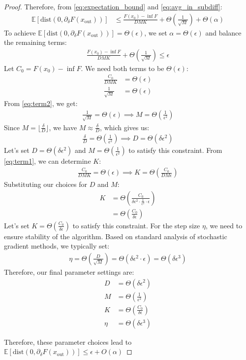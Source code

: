 \documentclass[letterpaper]{article} %
\newcommand{\1}{\mathbf{1}}
\begin{document}
\begin{proof}
Therefore, from \eqref{eq:expectation_bound} and \eqref{eq:avg_in_subdiff}:
\begin{align}
\mathbb{E}[\text{dist}(0, \partial_\delta F(x_{\text{out}}))] &\leq \frac{F(x_0) - \inf F}{D M K} + \Theta\left(\frac{1}{\sqrt{M}}\right) + \Theta(\alpha) \label{eq:dist_bound}
\end{align}
To achieve $\mathbb{E}[\text{dist}(0, \partial_\delta F(x_{\text{out}}))] = \Theta(\epsilon)$, we set $\alpha = \Theta(\epsilon)$ and balance the remaining terms:
\begin{align}
\frac{F(x_0) - \inf F}{D M K} + \Theta\left(\frac{1}{\sqrt{M}}\right) \leq \epsilon \label{eq:constraint}
\end{align}
Let $C_0 = F(x_0) - \inf F$. We need both terms to be $\Theta(\epsilon)$:
\begin{align}
\frac{C_0}{DMK} &= \Theta(\epsilon) \label{eq:term1} \\
\frac{1}{\sqrt{M}} &= \Theta(\epsilon) \label{eq:term2}
\end{align}
From \eqref{eq:term2}, we get:
\begin{align}
\frac{1}{\sqrt{M}} = \Theta(\epsilon) \implies M = \Theta\left(\frac{1}{\epsilon^2}\right)
\end{align}
Since $M = \lfloor\frac{\delta}{D}\rfloor$, we have $M \approx \frac{\delta}{D}$, which gives us:
\begin{align}
\frac{\delta}{D} = \Theta\left(\frac{1}{\epsilon^2}\right) \implies D = \Theta\left(\delta\epsilon^2\right)
\end{align}
Let's set $D = \Theta(\delta\epsilon^2)$ and $M = \Theta\left(\frac{1}{\epsilon^2}\right)$ to satisfy this constraint.
From \eqref{eq:term1}, we can determine $K$:
\begin{align}
\frac{C_0}{DMK} = \Theta(\epsilon) \implies K = \Theta\left(\frac{C_0}{DM\epsilon}\right)
\end{align}
Substituting our choices for $D$ and $M$:
\begin{align}
K &= \Theta\left(\frac{C_0}{\delta\epsilon^2 \cdot \frac{1}{\epsilon^2} \cdot \epsilon}\right) \\
&= \Theta\left(\frac{C_0}{\delta\epsilon}\right)
\end{align}
Let's set $K = \Theta\left(\frac{C_0}{\delta\epsilon}\right)$ to satisfy this constraint.
For the step size $\eta$, we need to ensure stability of the algorithm. Based on standard analysis of stochastic gradient methods, we typically set:
\begin{align}
\eta = \Theta\left(\frac{D}{\sqrt{M}}\right) = \Theta\left(\delta\epsilon^2 \cdot \epsilon\right) = \Theta\left(\delta\epsilon^3\right)
\end{align}
Therefore, our final parameter settings are:
\begin{align}
D &= \Theta(\delta\epsilon^2) \\
M &= \Theta\left(\frac{1}{\epsilon^2}\right) \\
K &= \Theta\left(\frac{C_0}{\delta\epsilon}\right) \\
\eta &= \Theta(\delta\epsilon^3)
\end{align}

Therefore, these parameter choices lead to $\mathbb{E}[\text{dist}(0, \partial_\delta F(x_{\text{out}}))] \leq \epsilon + O(\alpha)$

\end{proof}
\end{document}
